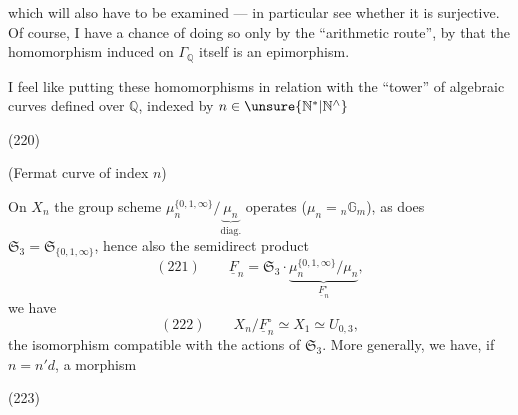 which will also have to be examined --- in particular see whether it is surjective.
Of course, I have a chance of doing so only by the ``arithmetic route'', by  that the homomorphism induced on $\Gamma_{\mathbb Q}$ itself is an epimorphism.



I feel like putting these homomorphisms in relation with the ``tower'' of algebraic curves defined over $\mathbb Q$, indexed by $n\in\unsure{\mathbb N^{*}|\mathbb N^{\wedge}}$

\begin{samepage}
\noindent (220)\quad
{}
\end{samepage}
\hfill (Fermat curve of index $n$)


On $X_n$ the group scheme $\mu_n^{\{0,1,\infty\}}/\underbrace{\mu_n}_{\mathrm{diag}.}$ operates ($\mu_n={}_n\mathbb G_m$),  as does $\mathfrak S_3=\mathfrak S_{\{0,1,\infty\}}$, hence also the semidirect product
\[
(221)\qquad \underline F_n=\mathfrak S_3\mathbin{\cdot}\underbrace{\mu_n^{\{0,1,\infty\}}/\mu_n}_{\underline F_n^{\circ}},
\]
we have
\[
(222)\qquad X_n/\underline F_n^{\circ}\simeq X_1\simeq U_{0,3},
\]
the isomorphism compatible with the actions of $\mathfrak S_3$. More generally, we have, if $n=n'd$, a morphism

\begin{samepage}
\noindent (223)\quad
{}
\end{samepage}

